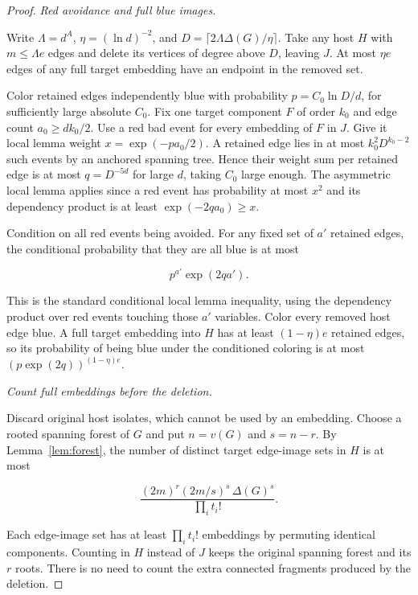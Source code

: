 \documentclass[11pt]{amsart}
\theoremstyle{definition}
\theoremstyle{remark}
\numberwithin{equation}{section}
\begin{document}
\begin{proof}

\medskip\noindent\emph{Red avoidance and full blue images.}

Write $\Lambda=d^A $, $\eta=(\ln d)^{-2}$, and $ D=\lceil2\Lambda\Delta(G)/\eta\rceil $. Take any host $ H $ with $ m\le\Lambda e $ edges and delete its vertices of degree above $ D $, leaving $ J $. At most $\eta e$ edges of any full target embedding have an endpoint in the removed set.

Color retained edges independently blue with probability $p=C_0\ln D/d $, for sufficiently large absolute $ C_0$. Fix one target component $ F $ of order $ k_0$ and edge count $ a_0\ge dk_0/2$. Use a red bad event for every embedding of $ F $ in $ J $. Give it local lemma weight $ x=\exp(-pa_0/2)$. A retained edge lies in at most $ k_0^2D^{k_0-2}$ such events by an anchored spanning tree. Hence their weight sum per retained edge is at most $ q=D^{-5d}$ for large $ d $, taking $ C_0$ large enough. The asymmetric local lemma applies since a red event has probability at most $ x^2$ and its dependency product is at least $\exp(-2qa_0)\ge x$.

Condition on all red events being avoided. For any fixed set of $a'$ retained edges, the conditional probability that they are all blue is at most

\begin{equation}
p^{a'}\exp(2qa').
\end{equation}

This is the standard conditional local lemma inequality, using the dependency product over red events touching those $a'$ variables. Color every removed host edge blue. A full target embedding into $ H $ has at least $(1-\eta)e $ retained edges, so its probability of being blue under the conditioned coloring is at most $(p\exp(2q))^{(1-\eta)e}$.

\medskip\noindent\emph{Count full embeddings before the deletion.}

Discard original host isolates, which cannot be used by an embedding. Choose a rooted spanning forest of $G $ and put $ n=v(G)$ and $ s=n-r $. By Lemma~\ref{lem:forest}, the number of distinct target edge-image sets in $ H$ is at most

\begin{equation}
\frac{(2m)^r(2m/s)^s\,\Delta(G)^s}{\prod_i t_i!}.
\end{equation}

Each edge-image set has at least $\prod_i t_i!$ embeddings by permuting identical components. Counting in $ H $ instead of $ J $ keeps the original spanning forest and its $ r$ roots. There is no need to count the extra connected fragments produced by the deletion.


\end{proof}
\end{document}
